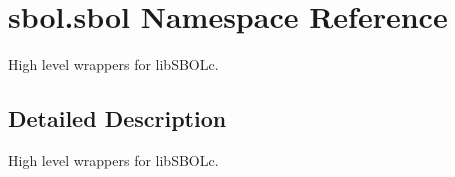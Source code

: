\hypertarget{namespacesbol_1_1sbol}{}\section{sbol.\+sbol Namespace Reference}
\label{namespacesbol_1_1sbol}


High level wrappers for lib\+S\+B\+O\+Lc.  




\subsection{Detailed Description}
High level wrappers for lib\+S\+B\+O\+Lc. 